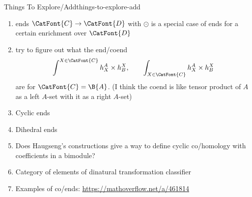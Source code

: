 \begin{remark}{Things To Explore/Add}{things-to-explore-add}
\begin{enumerate}
\[                \qquad
                \begin{aligned}
                    \int^{A\in\CatFont{C}}\Sets(h_{A},\SheafFont{F}^{A}),\\
                    \int^{A\in\CatFont{C}}\Sets(h^{A},F_{A})
                \end{aligned}
            \]%
            and the co/ends
            \[
                \begin{aligned}
                    \int^{A\in\CatFont{C}}\SheafFont{F}^{A}\odot h_{A},\\
                    \int^{A\in\CatFont{C}}F_{A}\odot h^{A},\\
                    \int_{A\in\CatFont{C}}\SheafFont{F}^{A}\odot h_{A},\\
                    \int_{A\in\CatFont{C}}F_{A}\odot h^{A},\\
                \end{aligned}
                \qquad
                \begin{aligned}
                    \int_{A\in\CatFont{C}}\Sets(\SheafFont{F}^{A},h_{A}),\\
                    \int_{A\in\CatFont{C}}\Sets(F_{A},h^{A}),\\
                    \int^{A\in\CatFont{C}}\Sets(\SheafFont{F}^{A},h_{A}),\\
                    \int^{A\in\CatFont{C}}\Sets(F_{A},h^{A})
                \end{aligned}
            \]%
            are.
        \item ends $\CatFont{C}\to\CatFont{D}$ with $\odot$ is a special case of ends for a certain enrichment over $\CatFont{D}$
        \item try to figure out what the end/coend
            \[
                \int^{X\in\CatFont{C}}h^{A}_{X}\times h^{X}_{B},%
                \qquad%
                \int_{X\in\CatFont{C}}h^{A}_{X}\times h^{X}_{B}%
            \]%
            are for $\CatFont{C}=\B{A}$. (I think the coend is like tensor product of $A$ as a left $A$-set with it as a right $A$-set)
        \item Cyclic ends
        \item Dihedral ends
        \item Does Haugseng's constructions give a way to define cyclic co/homology with coefficients in a bimodule?
        \item Category of elements of dinatural transformation classifier
        \item Examples of co/ends: \url{https://mathoverflow.net/a/461814}

\end{enumerate}
\end{remark}
